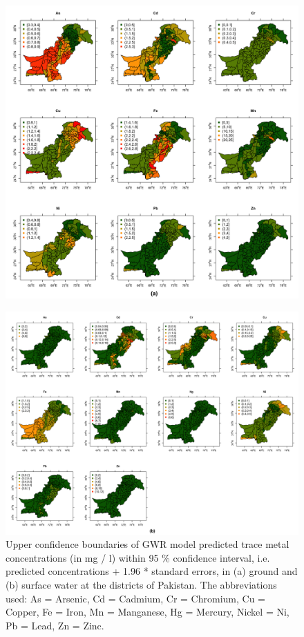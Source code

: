 \begin{figure}[hp!]
  \centering
  \includegraphics[width=1.1\textwidth]{Figures/Fig_D_4_a.png}
  \label{Fig_D_4_a}
\end{figure}

\newpage

\begin{landscape}

\begin{figure}[hp!]
  \centering
  \vspace{-2.5cm} \includegraphics[width=\linewidth]{Figures/Fig_D_4_b.png}
  \caption{Upper confidence boundaries of GWR model predicted trace metal concentrations (in mg / l) within 95 \% confidence interval, i.e. predicted concentrations + 1.96 * standard errors, in (a) ground and (b) surface water at the districts of Pakistan. The abbreviations used: As = Arsenic, Cd = Cadmium, Cr = Chromium, Cu = Copper, Fe = Iron, Mn = Manganese, Hg = Mercury, Nickel = Ni, Pb = Lead, Zn = Zinc.}
  \label{Fig_D_4_b}
\end{figure}

\end{landscape}

